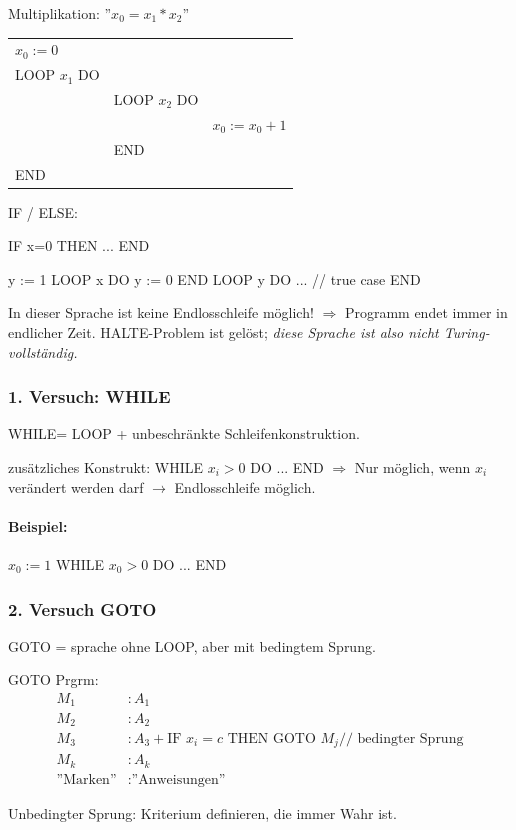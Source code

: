 Multiplikation: ''$x_0 = x_1 * x_2$''

\begin{tabu}{l l l}
$x_0 := 0$ &&  \\
LOOP $x_1$ DO && \\
	& LOOP $x_2$ DO &\\
		&& $x_0 := x_0 + 1$ \\
	& END & \\
END
\end{tabu}
 
IF / ELSE: 

IF x=0 THEN
	...
END


y := 1
LOOP x DO
	y := 0
END
LOOP y DO
	... // true case
END



In dieser Sprache ist keine Endlosschleife möglich! $\Rightarrow$ Programm endet immer in endlicher Zeit. HALTE-Problem ist gelöst; \emph{diese Sprache ist also nicht Turing-vollständig.}


\subsubsection{1. Versuch: WHILE}
WHILE= LOOP + unbeschränkte Schleifenkonstruktion.

zusätzliches Konstrukt:
WHILE $x_i > 0$ DO 
	...
END
$\Rightarrow$ Nur möglich, wenn $x_i$ verändert werden darf $\rightarrow$ Endlosschleife möglich.

\paragraph{Beispiel:}

$x_0 := 1$
WHILE $x_0 > 0$ DO ... END


\subsubsection{2. Versuch GOTO}
GOTO = sprache ohne LOOP, aber mit bedingtem Sprung.

GOTO Prgrm: 
\begin{align*}
	M_1 &: A_1 \\
	M_2 &: A_2 \\
	M_3 &: A_3  + \text{IF } x_i = c \text{ THEN GOTO } M_j \text{// bedingter Sprung}\\
	M_k &: A_k \\
	\text{''Marken''} &: \text{''Anweisungen''}
\end{align*}

Unbedingter Sprung: Kriterium definieren, die immer Wahr ist.

